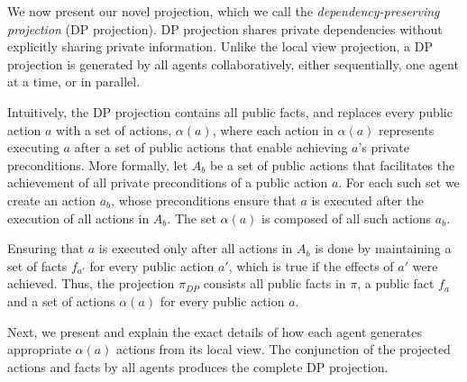 \documentclass[letterpaper]{article}
\theoremstyle{definition}
\begin{document}
We now present our novel projection, which we call the {\em dependency-preserving projection} (DP projection). DP projection shares private dependencies without explicitly sharing private information. Unlike the local view projection, a DP projection is generated by all agents collaboratively, either sequentially, one agent at a time, or in parallel. 

Intuitively, the DP projection contains all public facts, and replaces every public action $a$ with a set of actions, $\alpha(a)$, where each action in $\alpha(a)$ represents executing $a$ after a set of public actions that enable achieving $a$'s private preconditions.
More formally, let $A_b$ be a set of public actions that facilitates the achievement of all private preconditions of a public action $a$. For each such set we create an action $a_b$, whose preconditions ensure that $a$ is executed after the execution of all actions in $A_b$. The set $\alpha(a)$ is composed of all such actions $a_b$.

Ensuring that $a$ is executed only after all actions in $A_b$ is done by maintaining a set of facts $f_{a'}$ for every public action $a'$, which is true if the effects of $a'$ were achieved. Thus, the projection $\pi_{DP}$ consists all public facts in $\pi$, a public fact $f_a$ and a set of actions $\alpha(a)$ for every public action $a$.

Next, we present and explain the exact details of how each agent generates appropriate $\alpha(a)$ actions from its local view. The conjunction of the projected actions and facts by all agents produces the complete DP projection.






\end{document}
